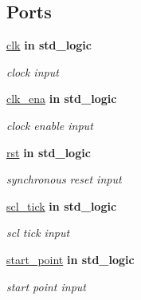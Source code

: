\subsection*{Ports}
 \begin{DoxyCompactItemize}
\item 
\hyperlink{classstart__generator_a4a4609c199d30b3adebbeb3a01276ec5}{clk}  {\bfseries {\bfseries \textcolor{vhdlchar}{in}\textcolor{vhdlchar}{ }}} {\bfseries \textcolor{vhdlchar}{std\+\_\+logic}\textcolor{vhdlchar}{ }} 
\begin{DoxyCompactList}\small\item\em clock input \end{DoxyCompactList}\item 
\hyperlink{classstart__generator_a373faa4fdd1aebdfb0b95d5d53da4434}{clk\+\_\+ena}  {\bfseries {\bfseries \textcolor{vhdlchar}{in}\textcolor{vhdlchar}{ }}} {\bfseries \textcolor{vhdlchar}{std\+\_\+logic}\textcolor{vhdlchar}{ }} 
\begin{DoxyCompactList}\small\item\em clock enable input \end{DoxyCompactList}\item 
\hyperlink{classstart__generator_ae0366c76519a377d49a533f4eff582ad}{rst}  {\bfseries {\bfseries \textcolor{vhdlchar}{in}\textcolor{vhdlchar}{ }}} {\bfseries \textcolor{vhdlchar}{std\+\_\+logic}\textcolor{vhdlchar}{ }} 
\begin{DoxyCompactList}\small\item\em synchronous reset input \end{DoxyCompactList}\item 
\hyperlink{classstart__generator_ad9d06ff2f81f48b03857f1a38ce130d6}{scl\+\_\+tick}  {\bfseries {\bfseries \textcolor{vhdlchar}{in}\textcolor{vhdlchar}{ }}} {\bfseries \textcolor{vhdlchar}{std\+\_\+logic}\textcolor{vhdlchar}{ }} 
\begin{DoxyCompactList}\small\item\em scl tick input \end{DoxyCompactList}\item 
\hyperlink{classstart__generator_a3d23bfd08667d8c545bdbd9bf1048041}{start\+\_\+point}  {\bfseries {\bfseries \textcolor{vhdlchar}{in}\textcolor{vhdlchar}{ }}} {\bfseries \textcolor{vhdlchar}{std\+\_\+logic}\textcolor{vhdlchar}{ }} 
\begin{DoxyCompactList}\small\item\em start point input \end{DoxyCompactList}\item 

\end{DoxyCompactItemize}
